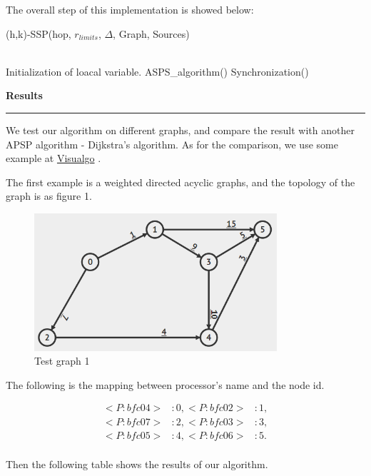 \documentclass[11pt]{article}  %
\begin{document}
\begin{enumerate}
    The overall step of this implementation is showed below:
        \begin{algorithm}[htb] 
        \caption{(h,k)-SSP(hop, $r_{limits}$, $\Delta$, Graph, Sources)} 
        \label{alg:Framwork} 
        \begin{algorithmic}[1] %
        \REQUIRE ~~\\ %
        \STATE Initialization of loacal variable.
        \STATE ASPS\_algorithm()
        \STATE Synchronization()
        \ENDWHILE
        \end{algorithmic}
        \end{algorithm}
   
    
\end{enumerate}

{\bf Results}

\rule{6in}{.1pt}       %

We test our algorithm on different graphs, and compare the result with another APSP algorithm - Dijkstra's algorithm. As for the comparison, we use some example at \href{https://visualgo.net/en/sssp}{Visualgo} .\par

The first example is a weighted directed acyclic graphs, and the topology of the graph is as figure 1.

\begin{figure}[ht]
\centering
\includegraphics[width=9cm]{dag/0.png}
\caption{Test graph 1}
\end{figure}\par

The following is the mapping between processor's name and the node id.\par

\begin{equation}\nonumber
\begin{aligned}
<P:bfc04>&: 0, 
<P:bfc02>&: 1, \\
<P:bfc07>&: 2, 
<P:bfc03>&: 3, \\
<P:bfc05>&: 4, 
<P:bfc06>&: 5. \\
\end{aligned}
\end{equation}\par
Then the following table shows the results of our algorithm.\par 
\end{document}
